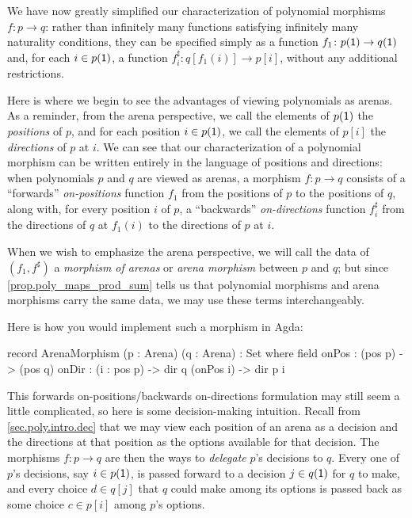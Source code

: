 \documentclass[Book-Poly]{subfiles}
\begin{document}
We have now greatly simplified our characterization of polynomial morphisms $f \colon p \to q$: rather than infinitely many functions satisfying infinitely many naturality conditions, they can be specified simply as a function $f_1 \colon p(\textsf{1}) \to q(\textsf{1})$ and, for each $i \in p(\textsf{1})$, a function $f^\sharp_i \colon q[f_1(i)] \to p[i]$, without any additional restrictions.

Here is where we begin to see the advantages of viewing polynomials as arenas.
As a reminder, from the arena perspective, we call the elements of $p(\textsf{1})$ the \emph{positions} of $p$, and for each position $i \in p(\textsf{1})$, we call the elements of $p[i]$ the \emph{directions} of $p$ at $i$.
We can see that our characterization of a polynomial morphism can be written entirely in the language of positions and directions: when polynomials $p$ and $q$ are viewed as arenas, a morphism $f \colon p \to q$ consists of a ``forwards'' \emph{on-positions} function $f_1$ from the positions of $p$ to the positions of $q$, along with, for every position $i$ of $p$, a ``backwards'' \emph{on-directions} function $f^\sharp_i$ from the directions of $q$ at $f_1(i)$ to the directions of $p$ at $i$.

When we wish to emphasize the arena perspective, we will call the data of $(f_1, f^\sharp)$ a \emph{morphism of arenas} or \emph{arena morphism} between $p$ and $q$; but since \cref{prop.poly_maps_prod_sum} tells us that polynomial morphisms and arena morphisms carry the same data, we may use these terms interchangeably.

Here is how you would implement such a morphism in Agda:
\begin{agda}
record ArenaMorphism (p : Arena) (q : Arena) : Set where
   field
     onPos : (pos p) -> (pos q)
     onDir : (i : pos p) -> dir q (onPos i) -> dir p i
\end{agda}

This forwards on-positions/backwards on-directions formulation may still seem a little complicated, so here is some decision-making intuition.
Recall from \cref{sec.poly.intro.dec} that we may view each position of an arena as a decision and the directions at that position as the options available for that decision.
The morphisms $f\colon p\to q$ are then the ways to \emph{delegate} $p$'s decisions to $q$. Every one of $p$'s decisions, say $i\in p(\textsf{1})$, is passed forward to a decision $j\in q(\textsf{1})$ for $q$ to make, and every choice $d\in q[j]$ that $q$ could make among its options is passed back as some choice $c\in p[i]$ among $p$'s options.
\end{document}
